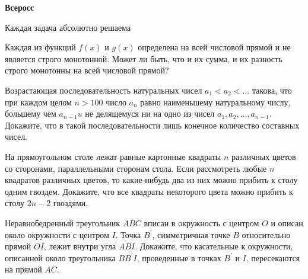 \centerline{\bf \Huge Всеросс}

\begin{flushright}
        \scriptsize{Каждая задача абсолютно решаема}
\end{flushright}

Каждая из функций $f(x)$ и $g(x)$ определена на всей числовой прямой и не является строго монотонной. Может ли быть, что и их сумма, и их разность строго монотонны на всей числовой прямой?

Возрастающая последовательность натуральных чисел $a_1<a_2<\ldots$ такова, что при каждом целом $n>100$ число $a_n$ равно наименьшему натуральному числу, большему чем $a_{n-1} u$ не делящемуся ни на одно из чисел $a_1, a_2, \ldots, a_{n-1}$. Докажите, что в такой последовательности лишь конечное количество составных чисел.

На прямоугольном столе лежат равные картонные квадраты $n$ различных цветов со сторонами, параллельными сторонам стола. Если рассмотреть любые $n$ квадратов различных цветов, то какие-нибудь два из них можно прибить к столу одним гвоздем. Докажите, что все квадраты некоторого цвета можно прибить к столу $2 n-2$ гвоздями.

Неравнобедренный треугольник $A B C$ вписан в окружность с центром $O$ и описан около окружности с центром $I$. Точка $B^{\prime}$, симметричная точке $B$ относительно прямой $O I$, лежит внутри угла $A B I$. Докажите, что касательные к окружности, описанной около треугольника $B B^{\prime} I$, проведенные в точках $B^{\prime}$ и $I$, пересекаются на прямой $A C$.
